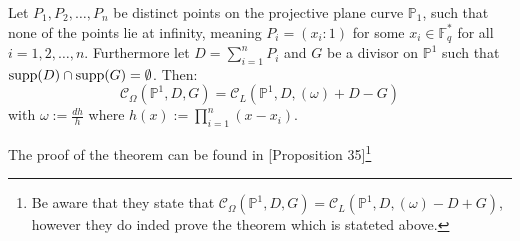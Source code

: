 \begin{theorem}\label{thm:res_is_eval}
  Let $P_1, P_2, \ldots, P_{n}$ be distinct points on the projective plane curve $\mathbb{P}_1$, such that none of the points lie at infinity, meaning $P_i = (x_i : 1)$ for some $x_i \in \mathbb{F}_q^{*}$ for all $i = 1, 2, \ldots, n$. Furthermore let $D = \sum_{i = 1}^n P_i$ and $G$ be a divisor on $\mathbb{P}^{1}$ such that $\textnormal{supp}(D) \cap \textnormal{supp}(G) = \emptyset$. Then:
  \begin{equation*}
    \mathcal{C}_{\Omega}(\mathbb{P}^1, D, G) = \mathcal{C}_L(\mathbb{P}^1, D, (\omega) + D - G)
  \end{equation*}
  with $\omega := \frac{dh}{h}$ where $h(x) := \prod_{i = 1}^n (x - x_{i})$.
\end{theorem}

The proof of the theorem can be found in \cite{AG_codes_and_applications}[Proposition 35]\footnote{Be aware that they state that $\mathcal{C}_{\Omega}(\mathbb{P}^1, D, G) = \mathcal{C}_L(\mathbb{P}^1, D, (\omega) - D + G)$, however they do inded prove the theorem which is stateted above.}

